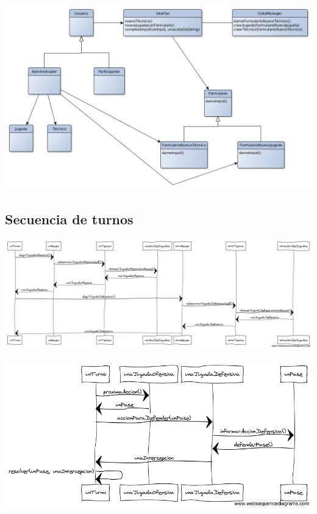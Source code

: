 \begin{center}
\includegraphics[scale=0.4]{diagramas/clases_nuevo_tecnico.png} 
\end{center}

\subsection{Secuencia de turnos}

\begin{center}
\includegraphics[scale=0.4]{diagramas/secuencias-turnos.png}
\end{center}


\begin{center}
\includegraphics[scale=0.4]{diagramas/secuencia-turnos-1.png}
\end{center}


